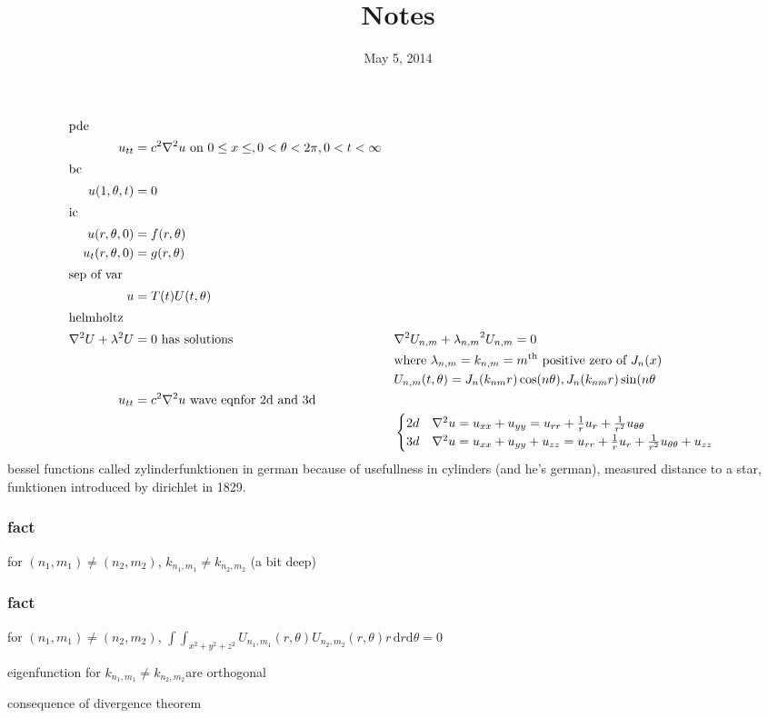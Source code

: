 \documentclass{article}
\begin{document}
\title{Notes}
\date{May 5, 2014}
\maketitle
\begin{align*}
  \intertext{pde}
  u_{tt}&=c^2\nabla^2u\text{ on }0\le x\le,0<\theta<2\pi,0<t<\infty\\
  \intertext{bc}
  u(1,\theta,t)&=0\\
  \intertext{ic}
  u(r,\theta,0)&=f(r,\theta)\\
  u_t(r,\theta,0)&=g(r,\theta)\\
  \intertext{sep of var}
  u&=T(t)U(t,\theta)\\
  \intertext{helmholtz}
  \nabla^2U+\lambda^2U&=0\text{ has solutions}&&\nabla^2U_{n,m}+{\lambda_{n,m}}^2U_{n,m}=0\\
  &&&\text{where }\lambda_{n,m}=k_{n,m}=m^{\text{th}}\text{ positive zero of }J_n(x)\\
  &&&U_{n,m}(t,\theta)=J_n(k_{nm}r)\cos(n\theta),J_n(k_{nm}r)\sin(n\theta\\
  u_{tt}&=c^2\nabla^2u\text{ wave eqnfor 2d and 3d}\\
  &&&\begin{cases}
  2d&\nabla^2u=u_{xx}+u_{yy}=u_{rr}+\frac{1}{r}u_r+\frac{1}{r^2}u_{\theta\theta}\\
  3d&\nabla^2u=u_{xx}+u_{yy}+u_{zz}=u_{rr}+\frac{1}{r}u_r+\frac{1}{r^2}u_{\theta\theta}+u_{zz}
  \end{cases}
\end{align*}
bessel functions called zylinderfunktionen in german because of usefullness in cylinders (and he's german), measured distance to a star, funktionen introduced by dirichlet in 1829.

\subsubsection*{fact}
for $(n_1,m_1)\ne(n_2,m_2)$, $k_{n_1,m_1}\ne k_{n_2,m_2}$ (a bit deep)

\subsubsection*{fact}
for $(n_1,m_1)\ne(n_2,m_2)$, $\int\int_{x^2+y^2+z^2}{U_{n_1,m_1}(r,\theta)U_{n_2,m_2}(r,\theta)r\,\mathrm{d}r\mathrm{d}\theta}=0$

eigenfunction for $k_{n_1,m_1}\ne k_{n_2,m_2}$are orthogonal

consequence of divergence theorem
\end{document}
